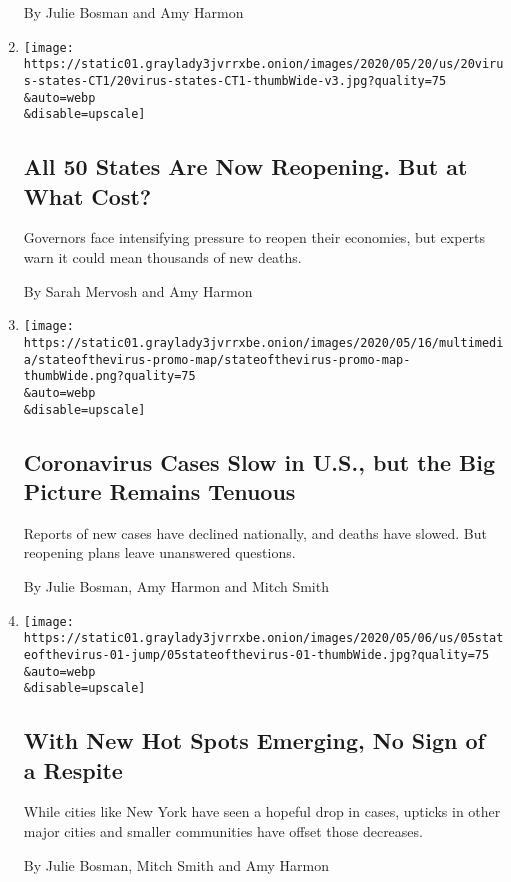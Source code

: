 \begin{enumerate}
  By Julie Bosman and Amy Harmon
\item
  \href{/2020/05/20/us/coronavirus-reopening-50-states.html}{}

  \texttt{[image: https://static01.graylady3jvrrxbe.onion/images/2020/05/20/us/20virus-states-CT1/20virus-states-CT1-thumbWide-v3.jpg?quality=75\\\&auto=webp\\\&disable=upscale]}

  \hypertarget{all-50-states-are-now-reopening-but-at-what-cost}{%
  \subsection{All 50 States Are Now Reopening. But at What
  Cost?}\label{all-50-states-are-now-reopening-but-at-what-cost}}

  Governors face intensifying pressure to reopen their economies, but
  experts warn it could mean thousands of new deaths.

  By Sarah Mervosh and Amy Harmon
\item
  \href{/2020/05/16/us/coronavirus-united-states.html}{}

  \texttt{[image: https://static01.graylady3jvrrxbe.onion/images/2020/05/16/multimedia/stateofthevirus-promo-map/stateofthevirus-promo-map-thumbWide.png?quality=75\\\&auto=webp\\\&disable=upscale]}

  \hypertarget{coronavirus-cases-slow-in-us-but-the-big-picture-remains-tenuous}{%
  \subsection{Coronavirus Cases Slow in U.S., but the Big Picture
  Remains
  Tenuous}\label{coronavirus-cases-slow-in-us-but-the-big-picture-remains-tenuous}}

  Reports of new cases have declined nationally, and deaths have slowed.
  But reopening plans leave unanswered questions.

  By Julie Bosman, Amy Harmon and Mitch Smith
\item
  \href{/2020/05/05/us/coronavirus-deaths-cases-united-states.html}{}

  \texttt{[image: https://static01.graylady3jvrrxbe.onion/images/2020/05/06/us/05stateofthevirus-01-jump/05stateofthevirus-01-thumbWide.jpg?quality=75\\\&auto=webp\\\&disable=upscale]}

  \hypertarget{with-new-hot-spots-emerging-no-sign-of-a-respite}{%
  \subsection{With New Hot Spots Emerging, No Sign of a
  Respite}\label{with-new-hot-spots-emerging-no-sign-of-a-respite}}

  While cities like New York have seen a hopeful drop in cases, upticks
  in other major cities and smaller communities have offset those
  decreases.

  By Julie Bosman, Mitch Smith and Amy Harmon
\end{enumerate}

